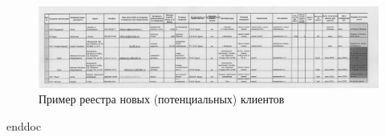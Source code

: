 \begin{figure}[!h]
\begin{center}
\includegraphics[height=0.3\textheight, width=1.1\textwidth, angle=90, keepaspectratio]{Pics/I.3..jpg}
\end{center}
 \caption{Пример реестра новых (потенциальных) клиентов }
 \label{pic:I.3..jpg}
\end{figure}
\clearpage

%
%
%
%


 {enddoc} 